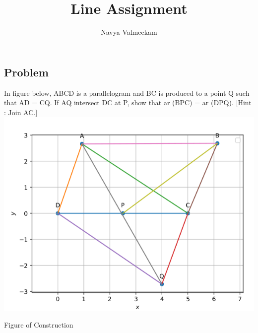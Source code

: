 \documentclass[journal,12pt,twocolumn]{IEEEtran}
\title{Line Assignment}
\author{Navya Valmeekam}
\begin{document}
\maketitle
\begin{tableofcontents}
\section{Problem}
\noindent In figure below, ABCD is a parallelogram and BC is produced to a point Q such that AD = CQ. If AQ intersect DC at P, show that ar (BPC) = ar (DPQ).
[Hint : Join AC.]
\includegraphics[scale=0.4]{construction.png}
\begin{center}
Figure of Construction
\end{center}

\end{tableofcontents}
\end{document}
